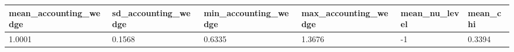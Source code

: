 \begin{tabular}{llllll}
\hline
mean\_accounting\_wedge & sd\_accounting\_wedge & min\_accounting\_wedge & max\_accounting\_wedge & mean\_nu\_level & mean\_chi \\
\hline
1.0001 & 0.1568 & 0.6335 & 1.3676 & -1 & 0.3394 \\
\hline
\end{tabular}
